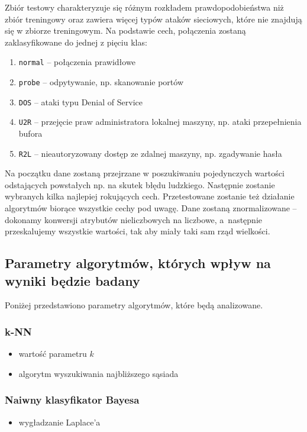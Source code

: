 \documentclass[a4paper, 12pt]{article}
\begin{document}
Zbiór testowy charakteryzuje się różnym rozkładem prawdopodobieństwa niż zbiór treningowy oraz
zawiera więcej typów ataków sieciowych, które nie znajdują się w zbiorze treningowym.
Na podstawie cech, połączenia zostaną zaklasyfikowane do jednej z pięciu klas:

\begin{enumerate}
 \item \texttt{normal} -- połączenia prawidłowe
 \item \texttt{probe} -- odpytywanie, np. skanowanie portów
 \item \texttt{DOS} -- ataki typu Denial of Service
 \item \texttt{U2R} -- przejęcie praw administratora lokalnej maszyny, np. ataki przepełnienia bufora
 \item \texttt{R2L} -- nieautoryzowany dostęp ze zdalnej maszyny, np. zgadywanie hasła
\end{enumerate}

Na początku dane zostaną przejrzane w poszukiwaniu pojedynczych wartości odstających
powstałych np. na skutek błędu ludzkiego. Następnie zostanie wybranych kilka najlepiej rokujących
cech. Przetestowane zostanie też działanie algorytmów biorące wszystkie cechy pod uwagę.
Dane zostaną znormalizowane -- dokonamy konwersji atrybutów nieliczbowych na liczbowe,
a~następnie przeskalujemy wszystkie wartości, tak aby miały taki sam rząd wielkości.

\subsection{Parametry algorytmów, których wpływ na wyniki będzie badany}
Poniżej przedstawiono parametry algorytmów, które będą analizowane.

\subsubsection*{k-NN}
\begin{itemize}
	\item wartość parametru $k$
	\item algorytm wyszukiwania najbliższego sąsiada
\end{itemize}

\subsubsection*{Naiwny klasyfikator Bayesa}
\begin{itemize}
	\item wygładzanie Laplace'a
\end{itemize}
\end{document}
